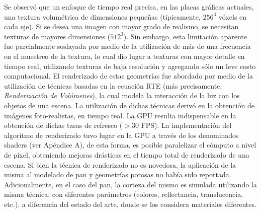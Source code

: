 Se observó que un enfoque de tiempo real precisa, en las placas gráficas actuales, una textura volumétrica de dimensiones pequeñas (típicamente, $256^{3}$ vóxels en cada eje).
Si se desea una imagen con mayor grado de realismo, se necesitan texturas de mayores dimensiones ($512^{3}$).
Sin embargo, esta limitación aparente fue parcialmente soslayada por medio de la utilización de más de una frecuencia en el muestreo de la textura, lo cual dio lugar a texturas con mayor detalle en tiempo real, utilizando texturas de baja resolución y agregando sólo un leve costo computacional.
El renderizado de estas geometrías fue abordado por medio de la utilización de técnicas basadas en la ecuación RTE (más precisamente, {\em Renderización de Volúmenes}), la cual modela la interacción de la luz con los objetos de una escena.
La utilización de dichas técnicas derivó en la obtención de imágenes foto-realistas, en tiempo real.
La GPU resulta indispensable en la obtención de dichas tasas de refresco ($> 30 $ FPS).
La implementación del algoritmo de renderizado tuvo lugar en la GPU a través de los denominados shaders (ver Apéndice A), de esta forma, es posible paralelizar el cómputo a nivel de píxel, obteniendo mejoras drásticas en el tiempo total de renderizado de una escena.
Si bien la técnica de renderizado no es novedosa, la aplicación de la misma al modelado de pan y geometrías porosas no había sido reportada.
Adicionalmente, en el caso del pan, la corteza del mismo es simulada utilizando la misma técnica, con diferentes parámetros (colores, reflectancia, translucencia, etc.), a diferencia del estado del arte, donde se los considera materiales diferentes.


